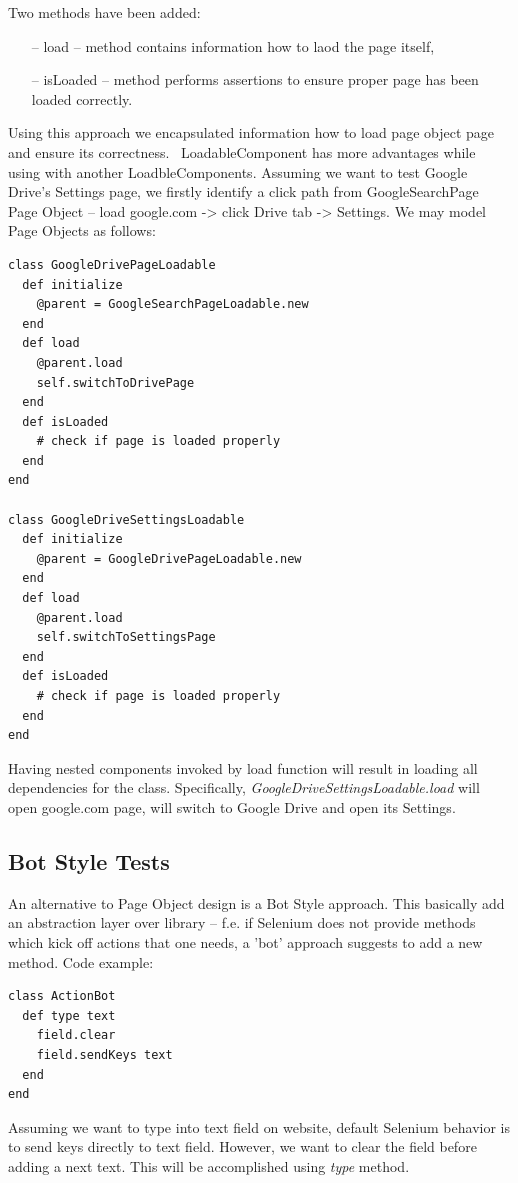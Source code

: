 \documentclass[12pt,twoside]{article}
\begin{document}
Two methods have been added:
\begin{itemize}
\item [--] load -- method contains information how to laod the page itself,
\item [--] isLoaded -- method performs assertions to ensure proper page has been loaded correctly.
\end{itemize}
Using this approach we encapsulated information how to load page object page and ensure its correctness. \
LoadableComponent has more advantages while using with another LoadbleComponents. Assuming we want to test Google Drive's Settings page, we firstly identify a click path from GoogleSearchPage Page Object -- load google.com -> click Drive tab -> Settings.
We may model Page Objects as follows:
\begin{verbatim}
class GoogleDrivePageLoadable 
  def initialize
    @parent = GoogleSearchPageLoadable.new
  end
  def load
    @parent.load
    self.switchToDrivePage
  end 
  def isLoaded
    # check if page is loaded properly
  end
end

class GoogleDriveSettingsLoadable
  def initialize 
    @parent = GoogleDrivePageLoadable.new
  end
  def load 
    @parent.load
    self.switchToSettingsPage
  end 
  def isLoaded
    # check if page is loaded properly  
  end
end
\end{verbatim}

Having nested components invoked by load function will result in loading all dependencies for the class. Specifically, \emph{GoogleDriveSettingsLoadable.load} will open google.com page, will switch to Google Drive and open its Settings.

\subsection{Bot Style Tests}
An alternative to Page Object design is a Bot Style approach. This basically add an abstraction layer over library -- f.e. if Selenium does not provide methods which kick off actions that one needs, a 'bot' approach suggests to add a new method. Code example:
\begin{verbatim}
class ActionBot
  def type text
    field.clear
    field.sendKeys text
  end
end
\end{verbatim} 
Assuming we want to type into text field on website, default Selenium behavior is to send keys directly to text field. However, we want to clear the field before adding a next text. This will be accomplished using \emph{type} method.
\end{document}
